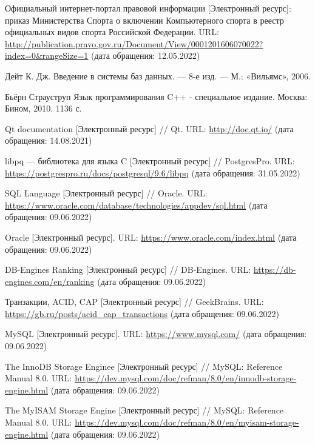 
\begin{thebibliography}{1}
	Официальный интернет-портал правовой информации [Электронный ресурс]:
	приказ Министерства Спорта о включении Компьютерного спорта в реестр официальных видов спорта Российской Федерации.
	URL: \url{http://publication.pravo.gov.ru/Document/View/0001201606070022?index=0&rangeSize=1}
	(дата обращения: 12.05.2022)
	
	Дейт К. Дж. Введение в системы баз данных. — 8-е изд. — М.: «Вильямс», 2006.
	
	Бьёрн Страуструп Язык программирования C++ - специальное издание. Москва: Бином, 2010. 1136 с.
	
	Qt documentation [Электронный ресурс] // Qt.
	URL: \url{http://doc.qt.io/}
	(дата обращения: 14.08.2021)
	
	libpq — библиотека для языка C [Электронный ресурс] // PostgresPro.
	URL: \url{https://postgrespro.ru/docs/postgresql/9.6/libpq}
	(дата обращения: 31.05.2022)
	
	SQL Language  [Электронный ресурс] // Oracle.
	URL: \url{https://www.oracle.com/database/technologies/appdev/sql.html}
	(дата обращения: 09.06.2022)
	
	Oracle [Электронный ресурс].
	URL: \url{https://www.oracle.com/index.html}
	(дата обращения: 09.06.2022)
	
	DB-Engines Ranking [Электронный ресурс] // DB-Engines.
	URL: \url{https://db-engines.com/en/ranking}
	(дата обращения: 09.06.2022)
	
	Транзакции, ACID, CAP [Электронный ресурс] // GeekBrains.
	URL: \url{https://gb.ru/posts/acid_cap_transactions}
	(дата обращения: 09.06.2022)
	
	MySQL [Электронный ресурс].
	URL: \url{https://www.mysql.com/}
	(дата обращения: 09.06.2022)
	
	The InnoDB Storage Enginee [Электронный ресурс] // MySQL: Reference Manual 8.0.
	URL: \url{https://dev.mysql.com/doc/refman/8.0/en/innodb-storage-engine.html}
	(дата обращения: 09.06.2022)
	
	The MyISAM Storage Engine [Электронный ресурс] // MySQL: Reference Manual 8.0.
	URL: \url{https://dev.mysql.com/doc/refman/8.0/en/myisam-storage-engine.html}
	(дата обращения: 09.06.2022)
	

\end{thebibliography}
